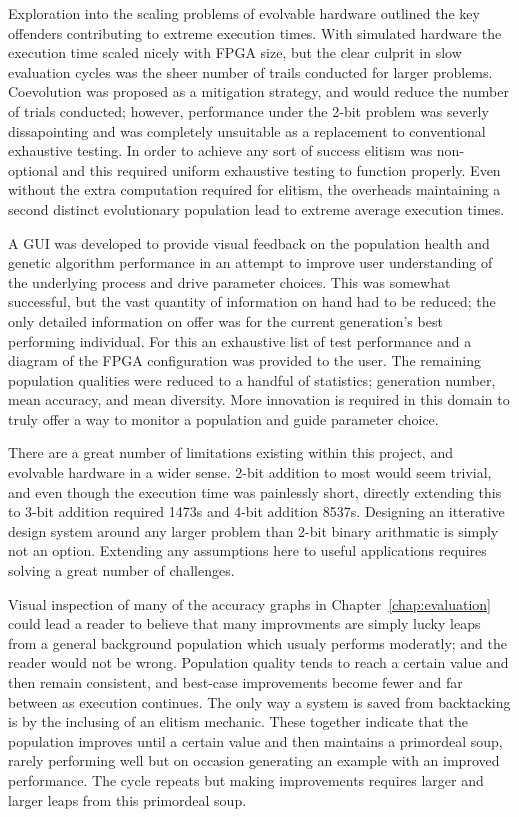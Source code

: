Exploration into the scaling problems of evolvable hardware outlined the key
offenders contributing to extreme execution times. With simulated hardware
the execution time scaled nicely with FPGA size, but the clear culprit in
slow evaluation cycles was the sheer number of trails conducted for larger
problems. Coevolution was proposed as a mitigation strategy, and would reduce
the number of trials conducted; however, performance under the 2-bit problem
was severly dissapointing and was completely unsuitable as a replacement to
conventional exhaustive testing. In order to achieve any sort of success
elitism was non-optional and this required uniform exhaustive testing to function
properly. Even without the extra computation required for elitism, the overheads
maintaining a second distinct evolutionary population lead to extreme average
execution times.

A GUI was developed to provide visual feedback on the population health
and genetic algorithm performance in an attempt to improve user understanding
of the underlying process and drive parameter choices. This was somewhat successful,
but the vast quantity of information on hand had to be reduced; the only detailed
information on offer was for the current generation's best performing individual.
For this an exhaustive list of test performance and a diagram of the FPGA configuration
was provided to the user. The remaining population qualities were reduced to a handful
of statistics; generation number, mean accuracy, and mean diversity. More innovation
is required in this domain to truly offer a way to monitor a population and guide
parameter choice.

There are a great number of limitations existing within this project, and
evolvable hardware in a wider sense. 2-bit addition to most would seem trivial,
and even though the execution time was painlessly short, directly extending
this to 3-bit addition required 1473s and 4-bit addition 8537s. Designing an
itterative design system around any larger problem than 2-bit binary arithmatic
is simply not an option. Extending
any assumptions here to useful applications requires solving a great number of
challenges.

Visual inspection of many of the accuracy graphs in Chapter~\ref{chap:evaluation}
could lead a reader to believe that many improvments are simply lucky leaps from
a general background population which usualy performs moderatly; and the reader
would not be wrong. Population quality tends to reach a certain value and then
remain consistent, and best-case improvements become fewer and far between as
execution continues. The only way a system is saved from backtacking is by the
inclusing of an elitism mechanic. These together indicate that the population improves
until a certain value and then maintains a primordeal soup, rarely performing well
but on occasion generating an example with an improved performance. The cycle repeats
but making improvements requires larger and larger leaps from this primordeal soup.

